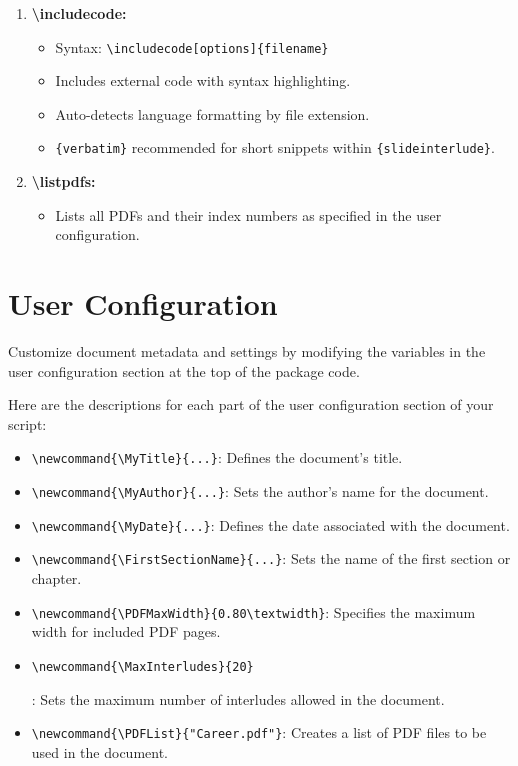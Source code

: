 \documentclass{article}
\begin{document}
\begin{enumerate}
    \begin{itemize}
        \item Syntax: \texttt{\textbackslash suppressslide\{PDF Number-Slide Number\}}
        \item Suppresses specific slides.
    \end{itemize}
    \item \textbf{\textbackslash includecode:}
    \begin{itemize}
        \item Syntax: \texttt{\textbackslash includecode[options]\{filename\}}
        \item Includes external code with syntax highlighting.
        \item Auto-detects language formatting by file extension.
        \item \texttt{\{verbatim\}} recommended for short snippets within \texttt{\{slideinterlude\}}.
    \end{itemize}
    \item \textbf{\textbackslash listpdfs:}
    \begin{itemize}
        \item Lists all PDFs and their index numbers as specified in the user configuration.
    \end{itemize}
\end{enumerate}

\section*{User Configuration}
Customize document metadata and settings by modifying the variables in the user configuration section at the top of the package code.

Here are the descriptions for each part of the user configuration section of your script:
\begin{itemize}
    \item \texttt{\textbackslash newcommand\{\textbackslash MyTitle\}\{...\}}: Defines the document's title.
    \item \texttt{\textbackslash newcommand\{\textbackslash MyAuthor\}\{...\}}: Sets the author's name for the document.
    \item \texttt{\textbackslash newcommand\{\textbackslash MyDate\}\{...\}}: Defines the date associated with the document.
    \item \texttt{\textbackslash newcommand\{\textbackslash FirstSectionName\}\{...\}}: Sets the name of the first section or chapter.
    \item \texttt{\textbackslash newcommand\{\textbackslash PDFMaxWidth\}\{0.80\textbackslash textwidth\}}: Specifies the maximum width for included PDF pages.
    \item \texttt{\textbackslash newcommand\{\textbackslash MaxInterludes\}\{20\}}

: Sets the maximum number of interludes allowed in the document.
    \item \texttt{\textbackslash newcommand\{\textbackslash PDFList\}\{"Career.pdf"\}}: Creates a list of PDF files to be used in the document.
\end{itemize}
\end{document}
